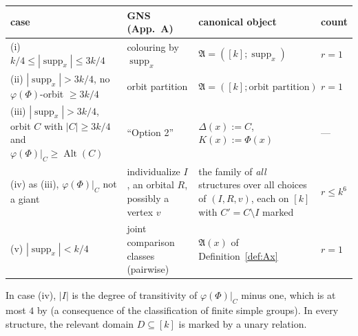 \documentclass[11pt]{article}
\theoremstyle{plain}
\theoremstyle{definition}
\theoremstyle{remark}
\theoremstyle{named}
\theoremstyle{namedrm}
\newcommand{\Alt}{\operatorname{Alt}}
\newcommand{\supp}{\operatorname{supp}}
\newcommand{\fA}{\mathfrak{A}}
\begin{document}
\begin{center}\small
\begin{tabularx}{\linewidth}{@{}L{3.6cm}L{2.6cm}Yl@{}}
\toprule
case & GNS (App.~A) & canonical object & count\\
\midrule
(i) $k/4\le|\supp_x|\le3k/4$ & colouring by $\supp_x$ & $\fA=([k];\supp_x)$ & $r=1$\\
(ii) $|\supp_x|>3k/4$, no $\varphi(\Phi)$-orbit $\ge3k/4$ & orbit partition & $\fA=([k];\text{orbit partition})$ & $r=1$\\
(iii) $|\supp_x|>3k/4$, orbit $C$ with $|C|\ge3k/4$ and $\varphi(\Phi)|_C\ge\Alt(C)$ & ``Option 2'' & $\Delta(x):=C$, $K(x):=\Phi(x)$ & ---\\
(iv) as (iii), $\varphi(\Phi)|_C$ not a giant & individualize $I$, an orbital $R$, possibly a vertex $v$ & the family of \emph{all} structures over all choices of $(I,R,v)$, each on $[k]$ with $C'=C\setminus I$ marked & $r\le k^6$\\
(v) $|\supp_x|<k/4$ & joint comparison classes (pairwise) & $\fA(x)$ of Definition~\ref{def:Ax} & $r=1$\\
\bottomrule
\end{tabularx}
\end{center}
In case (iv), $|I|$ is the degree of transitivity of $\varphi(\Phi)|_C$ minus one, which is at most $4$ by
\cite[Thm.~A.2]{GNS} (a consequence of the classification of finite simple groups). In every structure,
the relevant domain $D\subseteq[k]$ is marked by a unary relation.
\end{document}
